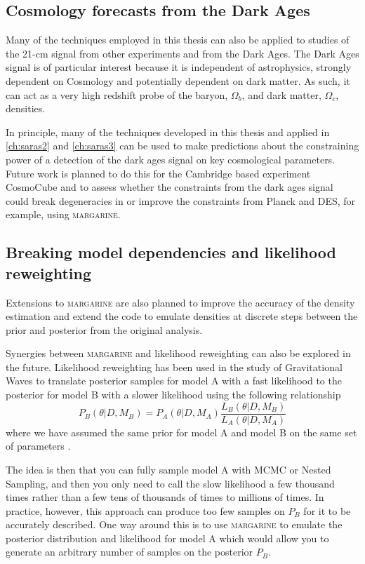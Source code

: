 \subsection{Cosmology forecasts from the Dark Ages}

Many of the techniques employed in this thesis can also be applied to studies of the 21-cm signal from other experiments and from the Dark Ages. The Dark Ages signal is of particular interest because it is independent of astrophysics, strongly dependent on Cosmology and potentially dependent on dark matter. As such, it can act as a very high redshift probe of the baryon, $\Omega_b$, and dark matter, $\Omega_c$, densities.

In principle, many of the techniques developed in this thesis and applied in \cref{ch:saras2} and \cref{ch:saras3} can be used to make predictions about the constraining power of a detection of the dark ages signal on key cosmological parameters. Future work is planned to do this for the Cambridge based experiment CosmoCube and to assess whether the constraints from the dark ages signal could break degeneracies in or improve the constraints from Planck and DES, for example, using \textsc{margarine}.

\subsection{Breaking model dependencies and likelihood reweighting}

Extensions to \textsc{margarine} are also planned to improve the accuracy of the density estimation and extend the code to emulate densities at discrete steps between the prior and posterior from the original analysis.

Synergies between \textsc{margarine} and likelihood reweighting can also be explored in the future. Likelihood reweighting has been used in the study of Gravitational Waves to translate posterior samples for model A with a fast likelihood to the posterior for model B with a slower likelihood using the following relationship
\begin{equation}
    P_B(\theta|D, M_B) = P_A(\theta|D, M_A) \frac{L_B(\theta|D, M_B)}{L_A(\theta|D, M_A)}
    \label{eq:likelihood-reweighting}
\end{equation}
where we have assumed the same prior for model A and model B on the same set of parameters \cite{Payne2019}.

The idea is then that you can fully sample model A with MCMC or Nested Sampling, and then you only need to call the slow likelihood a few thousand times rather than a few tens of thousands of times to millions of times. In practice, however, this approach can produce too few samples on $P_B$ for it to be accurately described. One way around this is to use \textsc{margarine} to emulate the posterior distribution and likelihood for model A which would allow you to generate an arbitrary number of samples on the posterior $P_B$.

